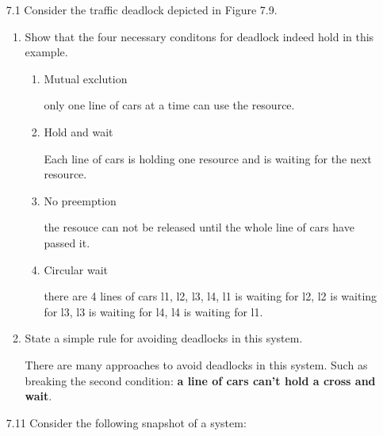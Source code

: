 \begin{enumerate}
    
\item [7.1] Consider the traffic deadlock depicted in Figure 7.9.
    \begin{enumerate}    
        \item Show that the four necessary conditons for deadlock indeed hold in this example.
        
        \begin{enumerate}
            \item Mutual exclution
            
            only one line of cars at a time can use the resource.
            
            \item Hold and wait
            
            Each line of cars is holding one resource and is waiting for the next resource.
            
            \item No preemption
            
            the resouce can not be released until the whole line of cars have passed it.
            
            \item Circular wait
            
            there are 4 lines of cars l1, l2, l3, l4, l1 is waiting for l2, l2 is waiting for l3, l3 is waiting for l4, l4 is waiting for l1.

        \end{enumerate}
        
        \item State a simple rule for avoiding deadlocks in this system.
        
        There are many approaches to avoid deadlocks in this system. Such as breaking the second condition: \textbf{a line of cars can't hold a cross and wait}.
        
    \end{enumerate}


\item [7.11] Consider the following snapshot of a system:


\end{enumerate}

